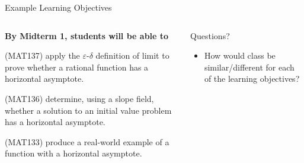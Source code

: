 \documentclass[10pt, aspectratio=169, t]{beamer}
\begin{document}
\begin{frame}{Example Learning Objectives}


\begin{columns}
\begin{column}{0.5\textwidth}

	{\noindent
	\bfseries
	By Midterm 1, students will be able to}
	\begin{block}{(MAT137)}
		\alert{apply} the $\varepsilon$-$\delta$ definition of limit to prove
		whether a rational function has a horizontal asymptote.
	\end{block}

	\begin{block}{(MAT136)}
		\alert{determine}, using a slope field, whether a solution to an initial value problem
		has a horizontal asymptote.
	\end{block}

	\begin{block}{(MAT133)}
		\alert{produce} a real-world example of a function with a horizontal asymptote.
	\end{block}

\end{column}
\begin{column}{0.5\textwidth}  %
	\begin{block}{Questions?}
		\begin{itemize}
			\item 
			How would class be similar/different for each of the learning objectives?
		\end{itemize}
	\end{block}
\end{column}
\end{columns}
\end{frame}
\end{document}
